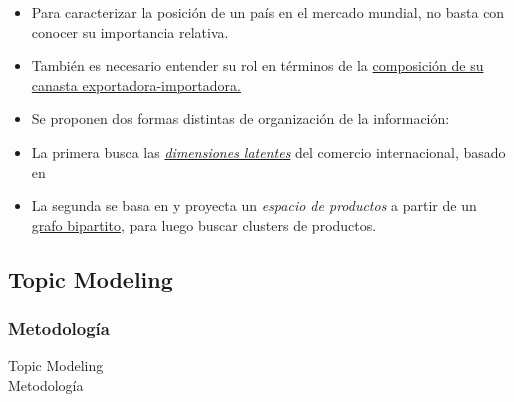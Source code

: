 \documentclass[compress]{beamer}
\begin{document}
\begin{frame}
\begin{itemize}[label=\faRebel]
	\item Para caracterizar la posición de un país en el mercado mundial, no basta con conocer su importancia relativa.
	\item También es necesario entender su rol en términos de la \underline{composición de su canasta exportadora-importadora.}
	
\end{itemize}
\end{frame}


\begin{frame}

\begin{itemize}[label=\faRebel]
	\item Se proponen dos formas distintas de organización de la información:
	\item La primera busca las \underline{\textit{dimensiones latentes}} del comercio internacional, basado en \citep{blei2003latent}
	\item La segunda se basa en \cite{Hidalgo2007,Hidalgo2009} y proyecta un \textit{espacio de productos} a partir de un \underline{grafo bipartito}, para luego buscar clusters de productos.
	
\end{itemize}
\end{frame}

\subsection{Topic Modeling}
\subsubsection{Metodología}

\begin{frame}
\centering
\Large Topic Modeling \\

\normalsize Metodología
\end{frame}
\end{document}
